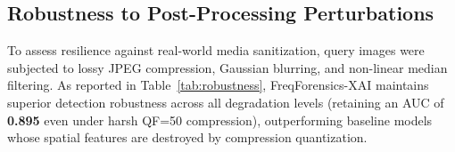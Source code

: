 \documentclass[journal]{IEEEtran}
\begin{document}
\begin{table}[!t]
\caption{Perturbation Resilience Matrix (AUC Under Post-Processing Degradation)}
\label{tab:robustness}
\centering
{}
\end{table}

\subsection{Robustness to Post-Processing Perturbations}
To assess resilience against real-world media sanitization, query images were subjected to lossy JPEG compression, Gaussian blurring, and non-linear median filtering. As reported in Table~\ref{tab:robustness}, FreqForensics-XAI maintains superior detection robustness across all degradation levels (retaining an AUC of \textbf{0.895} even under harsh QF=50 compression), outperforming baseline models whose spatial features are destroyed by compression quantization.
\end{document}
